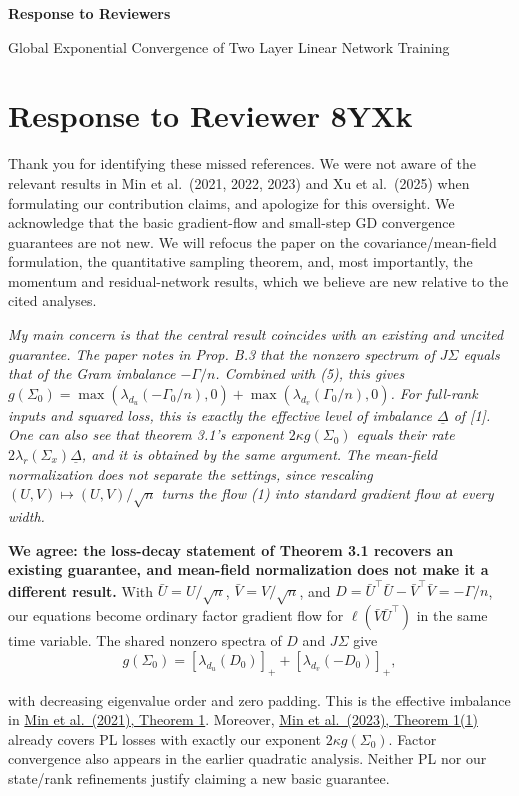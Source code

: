 \documentclass[11pt,a4paper]{article}
\renewenvironment{quote}
  {\par\addvspace{0.8em}\Needspace{8\baselineskip}%
    \list{}{\leftmargin=1.2em\rightmargin=0pt\topsep=0.25em
    \parsep=0.3em}\item\relax\normalsize\itshape\color{quotegray}}
  {\endlist\nopagebreak[4]}
\newif\iffirstreviewer
\newcommand{\reviewer}[1]{%
  \iffirstreviewer\firstreviewerfalse\else\clearpage\fi
  \markright{#1}%
  \section{#1}%
}
\begin{document}
{\LARGE\sffamily\bfseries Response to Reviewers\par}
\vspace{0.2em}
{\normalsize Global Exponential Convergence of Two Layer Linear Network Training\par}
\vspace{0.3em}

\reviewer{Response to Reviewer 8YXk}\label{response-to-reviewer-8yxk}

Thank you for identifying these missed references. We were not aware of the relevant results in Min et al.~(2021, 2022, 2023) and Xu et al.~(2025) when formulating our contribution claims, and apologize for this oversight. We acknowledge that the basic gradient-flow and small-step GD convergence guarantees are not new. We will refocus the paper on the covariance/mean-field formulation, the quantitative sampling theorem, and, most importantly, the momentum and residual-network results, which we believe are new relative to the cited analyses.

\begin{quote}
My main concern is that the central result coincides with an existing and uncited guarantee. The paper notes in Prop. B.3 that the nonzero spectrum of \(J\Sigma\) equals that of the Gram imbalance \(-\Gamma/n\). Combined with (5), this gives \(g(\Sigma_0)=\max(\lambda_{d_u}(-\Gamma_0/n),0)+\max(\lambda_{d_v}(\Gamma_0/n),0)\). For full-rank inputs and squared loss, this is exactly the effective level of imbalance \(\underline\Delta\) of {[}1{]}. One can also see that theorem 3.1's exponent \(2\kappa g(\Sigma_0)\) equals their rate \(2\lambda_r(\Sigma_x)\underline\Delta\), and it is obtained by the same argument. The mean-field normalization does not separate the settings, since rescaling \((U,V)\mapsto(U,V)/\sqrt n\) turns the flow (1) into standard gradient flow at every width.
\end{quote}

\textbf{We agree: the loss-decay statement of Theorem 3.1 recovers an existing guarantee, and mean-field normalization does not make it a different result.} With \(\bar U=U/\sqrt n\), \(\bar V=V/\sqrt n\), and \(D=\bar U^\top\bar U-\bar V^\top\bar V=-\Gamma/n\), our equations become ordinary factor gradient flow for \(\ell(\bar V\bar U^\top)\) in the same time variable. The shared nonzero spectra of \(D\) and \(J\Sigma\) give
\[
g(\Sigma_0)=[\lambda_{d_u}(D_0)]_+ +[\lambda_{d_v}(-D_0)]_+,
\]

with decreasing eigenvalue order and zero padding. This is the effective imbalance in \href{https://proceedings.mlr.press/v139/min21c/min21c.pdf}{Min et al.~(2021), Theorem 1}. Moreover, \href{https://proceedings.mlr.press/v202/min23d/min23d.pdf}{Min et al.~(2023), Theorem 1(1)} already covers PL losses with exactly our exponent \(2\kappa g(\Sigma_0)\). Factor convergence also appears in the earlier quadratic analysis. Neither PL nor our state/rank refinements justify claiming a new basic guarantee.
\end{document}
